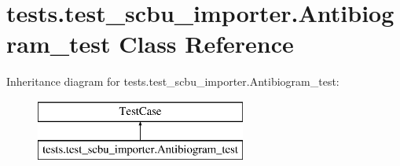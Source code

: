 \hypertarget{classtests_1_1test__scbu__importer_1_1_antibiogram__test}{\section{tests.\-test\-\_\-scbu\-\_\-importer.\-Antibiogram\-\_\-test Class Reference}
\label{classtests_1_1test__scbu__importer_1_1_antibiogram__test}
}
Inheritance diagram for tests.\-test\-\_\-scbu\-\_\-importer.\-Antibiogram\-\_\-test\-:\begin{figure}[H]
\begin{center}
\leavevmode
\includegraphics[height=2.000000cm]{classtests_1_1test__scbu__importer_1_1_antibiogram__test}
\end{center}
\end{figure}
